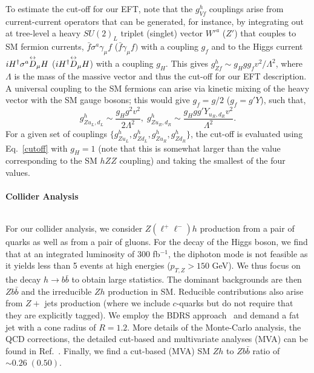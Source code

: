 \documentclass[../report.tex]{subfiles}
\begin{document}
To estimate  the cut-off for 
our EFT, note that the ${g}^h_{Vf}$ couplings arise from current-current operators that can be generated, for instance, 
by integrating out at tree-level a heavy $SU(2)_L$ triplet (singlet) vector $W'^a$ ($Z'$) that couples 
to SM fermion currents, $\bar{f} \sigma^a \gamma_\mu f$ ($\bar{f} \gamma_\mu f)$ with a coupling 
$g_f$ and to the Higgs current $i{H}^\dagger \sigma^a \overset{\text{\scriptsize$\leftrightarrow$}}{D}_\mu H$ ($i{H}^\dagger \overset{\text{\scriptsize$\leftrightarrow$}}{D}_\mu H$) 
with a coupling $g_H$. This gives ${g}^h_{Zf}\sim g_H g g_f v^2/\Lambda^2$,
where $\Lambda$ is the mass of the massive vector and thus the cut-off for our EFT description. A universal coupling to the SM fermions can arise  
via kinetic mixing of the heavy vector with the SM gauge bosons; this would give $g_f=g/2$ ($g_f=g' Y$), such that,
\begin{equation}
  \label{cutoff}
{g}^h_{Zu_L,d_L} \sim \frac{g_H g^2  v^2}{ 2\Lambda^2},\;
{g}^h_{Zu_R,d_R} \sim \frac{g_H g g' Y_{u_R,d_R} v^2}{\Lambda^2}.
\end{equation}
 For a given  set of couplings   $\{{g}^h_{Zu_L} ,{g}^h_{Zd_L} ,{g}^h_{Zu_R} ,{g}^h_{Zd_R} \}$, the cut-off is  evaluated using 
 Eq.~\ref{cutoff} with $g_H=1$ (note that this is somewhat larger than the value corresponding to the SM $hZZ$ coupling) and taking the smallest of the four values. \\ \\
 
                                                                                                                

\large{\bf Collider Analysis} \\ \\

\normalsize

For our collider analysis, we consider  $Z(\ell^+\ell^-)h$ production from a pair of quarks as well as from a 
pair of gluons.  For the decay of the Higgs boson,  we find that at an integrated luminosity of  300 fb$^{-1}$,  the diphoton mode is not feasible as it yields less than 5 events at high energies ($p_{T,Z}>150$ GeV). We thus focus on the decay $h\to b\bar b$ to obtain large statistics. The dominant backgrounds are then  
$Zb\bar{b}$ and the irreducible $Zh$ production in SM. Reducible contributions also arise from $Z+$ jets production (where we include $c$-quarks but do not require that they are explicitly tagged). We employ the BDRS 
approach~\cite{Butterworth:2008iy} and demand a fat jet with a cone radius of $R=1.2$. More details of the Monte-Carlo analysis, the QCD corrections, the detailed cut-based 
and multivariate analyses (MVA) can be found in Ref.~\cite{Banerjee:2018bio}. Finally, we find a cut-based (MVA) SM $Zh$ to $Zb\bar{b}$ ratio of $\sim 0.26 \; 
(0.50)$.
\end{document}
